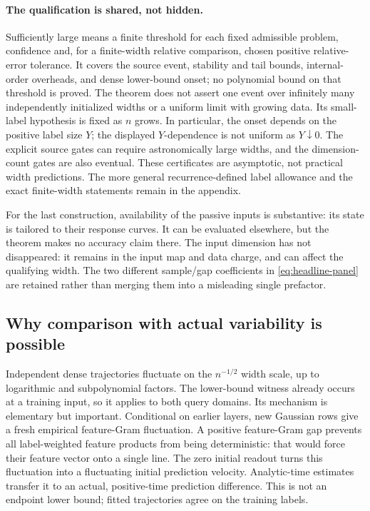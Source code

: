 \paragraph{The qualification is shared, not hidden.}
Sufficiently large means a finite threshold for each fixed admissible
problem, confidence and, for a finite-width relative comparison, chosen
positive relative-error tolerance. It covers the source event, stability and tail
bounds, internal-order overheads, and dense lower-bound onset; no
polynomial bound on that threshold is proved. The theorem does not assert
one event over infinitely many independently initialized widths or a
uniform limit with growing data. Its small-label hypothesis is fixed
as $n$ grows. In particular, the onset depends on the positive label size
$Y$; the displayed $Y$-dependence is not uniform as $Y\downarrow0$.
The explicit source gates can require astronomically large widths,
and the dimension-count gates are also eventual. These certificates
are asymptotic, not practical width predictions. The more general
recurrence-defined label allowance and
the exact finite-width statements remain in the appendix.

For the last construction, availability of the passive inputs is
substantive: its state is tailored to their response curves.
It can be evaluated elsewhere, but the theorem makes no accuracy claim
there. The input dimension has not disappeared: it remains in the input
map and data charge, and can affect the qualifying width. The two
different sample/gap coefficients in \eqref{eq:headline-panel} are retained
rather than merging them into a misleading single prefactor.



\subsection{Why comparison with actual variability is possible}
\label{sec:variability}

Independent dense trajectories fluctuate on the $n^{-1/2}$ width scale,
up to logarithmic and subpolynomial factors. The lower-bound witness
already occurs at a training input, so it applies to both query domains.
Its mechanism is elementary but important. Conditional on earlier layers,
new Gaussian rows give a fresh empirical feature-Gram fluctuation. A
positive feature-Gram gap prevents all label-weighted feature products
from being deterministic: that would force their feature vector onto a
single line. The zero initial readout turns this fluctuation into a
fluctuating initial prediction velocity. Analytic-time estimates transfer
it to an actual, positive-time prediction difference. This is not an
endpoint lower bound; fitted trajectories agree on the training labels.

